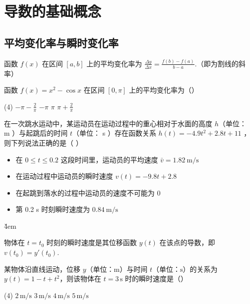 \section{导数的基础概念}

\subsection{平均变化率与瞬时变化率}

\begin{theorem}[平均变化率]
    函数 $f(x)$ 在区间 $[a, b]$ 上的平均变化率为 $\frac{\Delta y}{\Delta x} = \frac{f(b) - f(a)}{b - a}$.（即为割线的斜率）
\end{theorem}
\begin{example}
    函数 $f(x) = x^{2} - \cos x$ 在区间 $\left[ 0, \pi \right]$ 上的平均变化率为（\quad）
    \begin{tasks}(4)
        \task $- \pi - \frac{2}{\pi}$
        \task $- \pi$
        \task $\pi$
        \task $\pi + \frac{2}{\pi}$
    \end{tasks}
\end{example}

\vspace{4em}

\begin{example}
    在一次跳水运动中，某运动员在运动过程中的重心相对于水面的高度 $h$（单位： m ）与起跳后的时间 $t$（单位： s ）存在函数关系 $h(t)=-4.9 t^2+2.8 t+11$ ，则下列说法正确的是（ \quad）
    \begin{itemize}
        \item 在 $0 \leq t \leq 0.2$ 这段时间里，运动员的平均速度 $\bar{v}=1.82 \mathrm{~m} / \mathrm{s}$
        \item 在运动过程中运动员的瞬时速度 $v(t)=-9.8 t+2.8$
        \item 在起跳到落水的过程中运动员的速度不可能为 0
        \item 第 0.2 s 时刻瞬时速度为 $0.84 \mathrm{~m} / \mathrm{s}$
    \end{itemize}
\end{example}

\v{4em}

\begin{theorem}[瞬时速度的物理意义]
    物体在 $t=t_0$ 时刻的瞬时速度是其位移函数 $y(t)$ 在该点的导数，即 $v(t_0) = y'(t_0)$.
\end{theorem}

\begin{example}
    某物体沿直线运动，位移 $y$（单位：$\mathrm{m}$）与时间 $t$（单位：$\mathrm{s}$）的关系为 $y(t) = 1 - t + t^{2}$，则该物体在 $t = 3\,\mathrm{s}$ 时的瞬时速度是（\quad）
    \begin{tasks}(4)
        \task $2\,\mathrm{m/s}$
        \task $3\,\mathrm{m/s}$
        \task $4\,\mathrm{m/s}$
        \task $5\,\mathrm{m/s}$
    \end{tasks}
\end{example}

